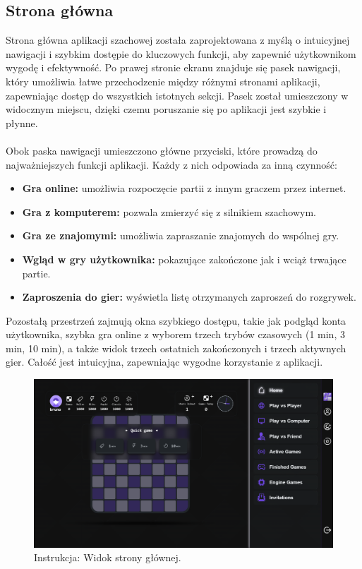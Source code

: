\documentclass[12pt,a4paper]{article}
\begin{document}
\newpage

\subsection{Strona główna}
Strona główna aplikacji szachowej została zaprojektowana z myślą o intuicyjnej nawigacji i szybkim dostępie do kluczowych funkcji, aby zapewnić użytkownikom wygodę i efektywność. Po prawej stronie ekranu znajduje się pasek nawigacji, który umożliwia łatwe przechodzenie między różnymi stronami aplikacji, zapewniając dostęp do wszystkich istotnych sekcji. Pasek został umieszczony w widocznym miejscu, dzięki czemu poruszanie się po aplikacji jest szybkie i płynne.
\\\\
Obok paska nawigacji umieszczono główne przyciski, które prowadzą do najważniejszych funkcji aplikacji. Każdy z nich odpowiada za inną czynność:

\begin{itemize}
    \item \textbf{Gra online:} umożliwia rozpoczęcie partii z innym graczem przez internet.
    \item \textbf{Gra z komputerem:} pozwala zmierzyć się z silnikiem szachowym.
    \item \textbf{Gra ze znajomymi:} umożliwia zapraszanie znajomych do wspólnej gry.
    \item \textbf{Wgląd w gry użytkownika:} pokazujące zakończone jak i wciąż trwające partie.
    \item \textbf{Zaproszenia do gier:} wyświetla listę otrzymanych zaproszeń do rozgrywek.
\end{itemize}

\noindent
Pozostałą przestrzeń zajmują okna szybkiego dostępu, takie jak podgląd konta użytkownika, szybka gra online z wyborem trzech trybów czasowych (1 min, 3 min, 10 min), a także widok trzech ostatnich zakończonych i trzech aktywnych gier. Całość jest intuicyjna, zapewniając wygodne korzystanie z aplikacji.

\vspace{0.5cm}
\begin{figure}[h!]
    \centering
    \includegraphics[width=1\textwidth]{images/ins_main.png}
    \caption{Instrukcja: Widok strony głównej.}
\end{figure}
\end{document}
